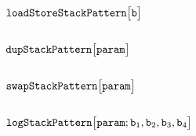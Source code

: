 \subsubsection{\zeroOneSP{}                                                                       \lispDone{}}  \label{hub: stack patterns: 0_1}              
\subsubsection{\oneOneSP{}                                                                        \lispDone{}}  \label{hub: stack patterns: 1_1}              
\subsubsection{\twoOneSP{}                                                                        \lispDone{}}  \label{hub: stack patterns: 2_1}              
\subsubsection{\threeOneSP{}                                                                      \lispDone{}}  \label{hub: stack patterns: 3_1}              
\subsubsection{$\texttt{loadStore}\texttt{StackPattern}\big[\texttt{b}\big]$                                                    \lispDone{}}  \label{hub: stack patterns: load store}       
\subsubsection{$\texttt{dup}\texttt{StackPattern}\big[\texttt{param}\big]$                                                      \lispDone{}}  \label{hub: stack patterns: dup}              
\subsubsection{$\texttt{swap}\texttt{StackPattern}\big[\texttt{param}\big]$                                                     \lispDone{}}  \label{hub: stack patterns: swap}             
\subsubsection{$\texttt{log}\texttt{StackPattern}\big[\texttt{param}; \texttt{b}_{1}, \texttt{b}_{2}, \texttt{b}_{3}, \texttt{b}_{4} \big]$ \lispDone{}}  \label{hub: stack patterns: log}              
